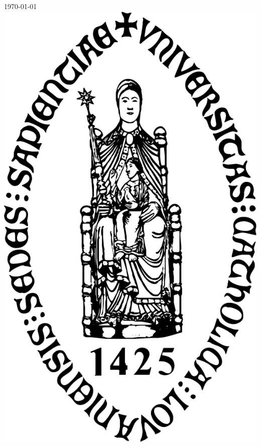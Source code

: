 \documentclass[11pt,a4paper]{article}
\begin{document}
\begin{titlepage}


{\large \today}\\[3cm] %


\includegraphics[scale=0.15]{sedes}\\[1cm] %
 

\end{titlepage}
\end{document}

